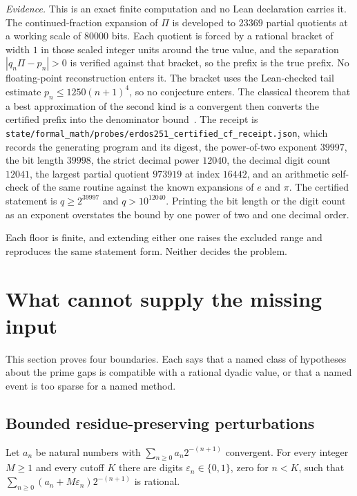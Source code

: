 \documentclass[11pt]{article}
\begin{document}
\emph{Evidence.}  This is an exact finite computation and no Lean declaration
carries it.  The continued-fraction expansion of $\Pi$ is developed to $23369$
partial quotients at a working scale of $80000$ bits.  Each quotient is forced
by a rational bracket of width $1$ in those scaled integer units around the
true value, and the separation $|q_n\Pi-p_n|>0$ is verified against that
bracket, so the prefix is the true prefix.  No floating-point reconstruction
enters it.  The bracket uses the Lean-checked tail estimate
$p_n\le1250(n+1)^4$, so no conjecture enters.  The classical theorem that a
best approximation of the second kind is a convergent then converts the
certified prefix into the denominator bound~\cite{khinchin1964}.  The receipt
is \texttt{state/formal\_math/probes/erdos251\_certified\_cf\_receipt.json},
which records the generating program and its digest, the power-of-two exponent
$39997$, the bit length $39998$, the strict decimal power $12040$, the decimal
digit count $12041$, the largest partial quotient $973919$ at index $16442$,
and an arithmetic self-check of the same routine against the known expansions
of $e$ and $\pi$.  The certified statement is $q\ge2^{39997}$ and
$q>10^{12040}$.  Printing the bit length or the digit count as an exponent
overstates the bound by one power of two and one decimal order.

Each floor is finite, and extending either one raises the excluded range and
reproduces the same statement form.  Neither decides the problem.

\section{What cannot supply the missing input}\label{long251:sec:obstructions}

This section proves four boundaries.  Each says that a named class of
hypotheses about the prime gaps is compatible with a rational dyadic value, or
that a named event is too sparse for a named method.

\subsection{Bounded residue-preserving perturbations}

\begin{theorem}\label{long251:res:boundedperturbation}
Let $a_n$ be natural numbers with $\sum_{n\ge0}a_n2^{-(n+1)}$ convergent.  For
every integer $M\ge1$ and every cutoff $K$ there are digits
$\varepsilon_n\in\{0,1\}$, zero for $n<K$, such that
$\sum_{n\ge0}(a_n+M\varepsilon_n)2^{-(n+1)}$ is rational.
\end{theorem}
\end{document}
